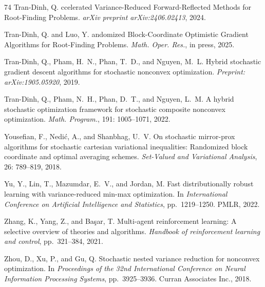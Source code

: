 \documentclass{article}
\theoremstyle{plain}
\theoremstyle{definition}
\theoremstyle{remark}
\begin{document}
\begin{thebibliography}{74}
Tran-Dinh, Q.
ccelerated {V}ariance-{R}educed {F}orward-{R}eflected {M}ethods
  for {R}oot-{F}inding {P}roblems.
\newblock \emph{arXiv preprint arXiv:2406.02413}, 2024.

Tran-Dinh, Q. and Luo, Y.
andomized {B}lock-{C}oordinate {O}ptimistic {G}radient
  {A}lgorithms for {R}oot-{F}inding {P}roblems.
\newblock \emph{Math. Oper. Res.}, in press, 2025.

Tran-Dinh, Q., Pham, H.~N., Phan, T.~D., and Nguyen, M.~L.
\newblock Hybrid stochastic gradient descent algorithms for stochastic
  nonconvex optimization.
\newblock \emph{Preprint: arXiv:1905.05920}, 2019.

Tran-Dinh, Q., Pham, N.~H., Phan, D.~T., and Nguyen, L.~M.
\newblock A hybrid stochastic optimization framework for stochastic composite
  nonconvex optimization.
\newblock \emph{Math. Program.}, 191: 1005--1071, 2022.

Yousefian, F., Nedi{\'c}, A., and Shanbhag, U.~V.
\newblock On stochastic mirror-prox algorithms for stochastic cartesian
  variational inequalities: {R}andomized block coordinate and optimal averaging
  schemes.
\newblock \emph{Set-Valued and Variational Analysis}, 26: 789--819,
  2018.

Yu, Y., Lin, T., Mazumdar, E.~V., and Jordan, M.
\newblock Fast distributionally robust learning with variance-reduced min-max
  optimization.
\newblock In \emph{International Conference on Artificial Intelligence and
  Statistics}, pp.\  1219--1250. PMLR, 2022.

Zhang, K., Yang, Z., and Ba{\c{s}}ar, T.
\newblock Multi-agent reinforcement learning: {A} selective overview of
  theories and algorithms.
\newblock \emph{Handbook of reinforcement learning and control}, pp.\
  321--384, 2021.

Zhou, D., Xu, P., and Gu, Q.
\newblock Stochastic nested variance reduction for nonconvex optimization.
\newblock In \emph{Proceedings of the 32nd International Conference on Neural
  Information Processing Systems}, pp.\  3925--3936. Curran Associates Inc.,
  2018.

\end{thebibliography}
\end{document}
